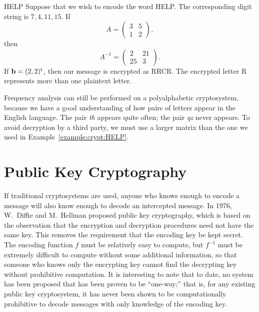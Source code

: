  
\begin{example}{HELP}
Suppose that we wish to encode the word HELP. The corresponding
digit string is $7, 4, 11, 15$. If
\[
A =
\begin{pmatrix}
3 & 5 \\
1 & 2
\end{pmatrix},
\]
then
\[
A^{-1} 
=
\begin{pmatrix}
2 & 21 \\
25 & 3
\end{pmatrix}.
\]
If ${\mathbf b} = ( 2, 2)^{\rm t}$, then our message is encrypted as
RRCR. The encrypted letter R represents more than one plaintext
letter. 
\end{example}
 
 
Frequency analysis can still be performed on a polyalphabetic
cryptosystem, because we have a good understanding of how pairs of
letters appear in the English language. The pair \emph{th} appears
quite often; the pair \emph{qz} never appears.  To avoid decryption by
a third party, we must use a larger matrix than the one we used in
Example~\ref{example:crypt:HELP}. 


  
 
 
\section{Public Key Cryptography}
 
 
 
If traditional cryptosystems are used, anyone who knows enough to
encode a message will also know enough to decode an intercepted
message. In 1976, W.~Diffie and
M.~Hellman proposed public key cryptography, which
is based on the observation that the encryption and decryption
procedures need not have the same key. This removes the requirement
that the encoding key be kept secret. The encoding function $f$ must
be relatively easy to compute, but $f^{-1}$ must be extremely
difficult to compute without some additional information, so that
someone who knows only the encrypting key cannot find the decrypting
key without prohibitive computation. It is interesting to note that to
date, no system has been proposed that has been proven to be
``one-way;'' that is, for any existing public key cryptosystem, it has
never been shown to be computationally prohibitive to decode messages
with only knowledge of the encoding key. 
 
 
 
